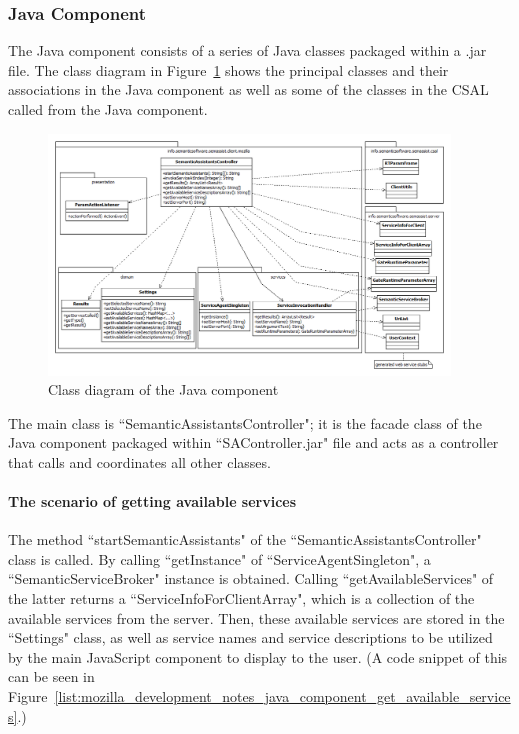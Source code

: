 \subsubsection{Java Component}
The Java component consists of a series of Java classes packaged within a .jar file. The class diagram in Figure~\ref{fig:mozilla_development_notes_java_component_class_diagram} shows the principal classes and their associations in the Java component as well as some of the classes in the CSAL called from the Java component. 

\begin{figure}[htb]
  \centering
  \includegraphics[width=0.95\textwidth]{pictures/mozilla_development_notes_java_component_class_diagram.png}
  \caption{Class diagram of the Java component}
  \label{fig:mozilla_development_notes_java_component_class_diagram}
\end{figure}

The main class is ``SemanticAssistantsController"; it is the facade class of the Java component packaged within ``SAController.jar" file and acts as a controller that calls and coordinates all other classes. 

\paragraph{The scenario of getting available services} The method ``startSemanticAssistants" of the ``SemanticAssistantsController" class is called. By calling ``getInstance" of ``ServiceAgentSingleton", a ``SemanticServiceBroker" instance is obtained. Calling ``getAvailableServices" of the latter returns a ``ServiceInfoForClientArray", which is a collection of the available services from the server. Then, these available services are stored in the ``Settings" class, as well as service names and service descriptions to be utilized by the main JavaScript component to display to the user. (A code snippet of this can be seen in Figure~\ref{list:mozilla_development_notes_java_component_get_available_services}.)

